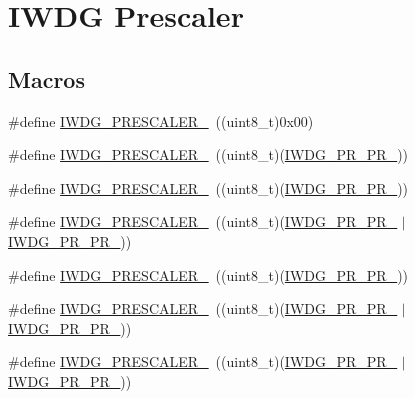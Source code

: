 \hypertarget{group___i_w_d_g___prescaler}{\section{I\-W\-D\-G Prescaler}
\label{group___i_w_d_g___prescaler}
}
\subsection*{Macros}
\begin{DoxyCompactItemize}
\item 
\#define \hyperlink{group___i_w_d_g___prescaler_ga470bb195d35ef7a0b75164c228b4ee69}{I\-W\-D\-G\-\_\-\-P\-R\-E\-S\-C\-A\-L\-E\-R\-\_}~((uint8\-\_\-t)0x00)
\item 
\#define \hyperlink{group___i_w_d_g___prescaler_ga5f00866f823ee700005e8a753b28ad75}{I\-W\-D\-G\-\_\-\-P\-R\-E\-S\-C\-A\-L\-E\-R\-\_}~((uint8\-\_\-t)(\hyperlink{group___peripheral___registers___bits___definition_ga9b727e7882603df1684cbf230520ca76}{I\-W\-D\-G\-\_\-\-P\-R\-\_\-\-P\-R\-\_}))
\item 
\#define \hyperlink{group___i_w_d_g___prescaler_gab3eb3c6a10facc8b0dc7c33608f6e129}{I\-W\-D\-G\-\_\-\-P\-R\-E\-S\-C\-A\-L\-E\-R\-\_}~((uint8\-\_\-t)(\hyperlink{group___peripheral___registers___bits___definition_gafba2551b90c68d95c736a116224b473e}{I\-W\-D\-G\-\_\-\-P\-R\-\_\-\-P\-R\-\_}))
\item 
\#define \hyperlink{group___i_w_d_g___prescaler_gac3f33494fb7aaa2845ac106858394e03}{I\-W\-D\-G\-\_\-\-P\-R\-E\-S\-C\-A\-L\-E\-R\-\_}~((uint8\-\_\-t)(\hyperlink{group___peripheral___registers___bits___definition_gafba2551b90c68d95c736a116224b473e}{I\-W\-D\-G\-\_\-\-P\-R\-\_\-\-P\-R\-\_} $\vert$ \hyperlink{group___peripheral___registers___bits___definition_ga9b727e7882603df1684cbf230520ca76}{I\-W\-D\-G\-\_\-\-P\-R\-\_\-\-P\-R\-\_}))
\item 
\#define \hyperlink{group___i_w_d_g___prescaler_ga52a956c645ce59312c84cbe37b2b20e4}{I\-W\-D\-G\-\_\-\-P\-R\-E\-S\-C\-A\-L\-E\-R\-\_}~((uint8\-\_\-t)(\hyperlink{group___peripheral___registers___bits___definition_ga55a1d7fde4e3e724a8644652ba9bb2b9}{I\-W\-D\-G\-\_\-\-P\-R\-\_\-\-P\-R\-\_}))
\item 
\#define \hyperlink{group___i_w_d_g___prescaler_ga17901d4e3e52af620acbbb146fd79264}{I\-W\-D\-G\-\_\-\-P\-R\-E\-S\-C\-A\-L\-E\-R\-\_}~((uint8\-\_\-t)(\hyperlink{group___peripheral___registers___bits___definition_ga55a1d7fde4e3e724a8644652ba9bb2b9}{I\-W\-D\-G\-\_\-\-P\-R\-\_\-\-P\-R\-\_} $\vert$ \hyperlink{group___peripheral___registers___bits___definition_ga9b727e7882603df1684cbf230520ca76}{I\-W\-D\-G\-\_\-\-P\-R\-\_\-\-P\-R\-\_}))
\item 
\#define \hyperlink{group___i_w_d_g___prescaler_ga885221d5bb09157c9e953a1be38556f0}{I\-W\-D\-G\-\_\-\-P\-R\-E\-S\-C\-A\-L\-E\-R\-\_}~((uint8\-\_\-t)(\hyperlink{group___peripheral___registers___bits___definition_ga55a1d7fde4e3e724a8644652ba9bb2b9}{I\-W\-D\-G\-\_\-\-P\-R\-\_\-\-P\-R\-\_} $\vert$ \hyperlink{group___peripheral___registers___bits___definition_gafba2551b90c68d95c736a116224b473e}{I\-W\-D\-G\-\_\-\-P\-R\-\_\-\-P\-R\-\_}))
\end{DoxyCompactItemize}


